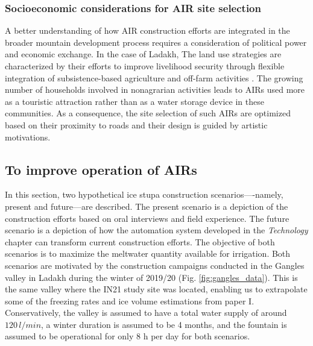 \subsubsection{Socioeconomic considerations for AIR site selection}

A better understanding of how AIR construction efforts are integrated in the broader mountain development process 
requires a consideration of political power and economic exchange. In the case of Ladakh, The land use strategies are 
characterized by their efforts to improve livelihood security through flexible integration of subsistence-based agriculture
and off-farm activities \citep{nusserIrrigationDevelopmentUpper2012}. The growing number of households involved in nonagrarian
activities leads to AIRs used more as a touristic attraction rather than as a water storage device in these
communities. As a consequence, the site selection of such AIRs are optimized based on their proximity to roads
and their design is guided by artistic motivations.

\subsection{To improve operation of AIRs}

In this section, two hypothetical ice stupa construction scenarios----namely, present and future---are
described. The present scenario is a depiction of the construction efforts based on oral interviews and field
experience. The future scenario is a depiction of how the automation system developed in the \textit{Technology}
chapter can transform current construction efforts. The objective of both scenarios is to maximize the meltwater
quantity available for irrigation. Both scenarios are motivated by the construction campaigns conducted in the
Gangles valley in Ladakh during the winter of 2019/20 (Fig. \ref{fig:gangles_data}). This is the same valley
where the IN21 study site was located, enabling us to extrapolate some of the freezing rates and ice volume
estimations from paper I. Conservatively, the valley is assumed to have a total water supply of around
$120\,l/min$, a winter duration is assumed to be 4 months, and the fountain is assumed to be  operational for
only 8 h per day for both scenarios. 


